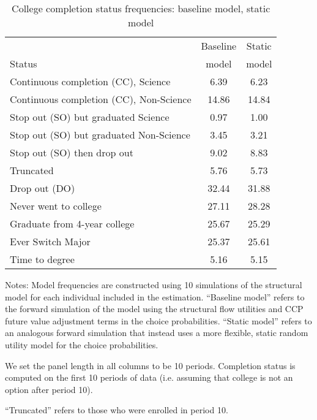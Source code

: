 \begin{table}[ht]
\caption{College completion status frequencies: baseline model, static model}
\label{tab:CCDOSOfwd-compare-fit}
\centering{}
\begin{threeparttable}
\begin{tabular}{lcc}
\toprule
                                          & Baseline & Static \\
Status                                    & model    & model  \\
\midrule
Continuous completion (CC), Science&6.39&6.23 \\
Continuous completion (CC), Non-Science&14.86&14.84 \\
Stop out (SO) but graduated Science&0.97&1.00 \\
Stop out (SO) but graduated Non-Science&3.45&3.21 \\
Stop out (SO) then drop out&9.02&8.83 \\
Truncated&5.76&5.73 \\
Drop out (DO)&32.44&31.88 \\
Never went to college&27.11&28.28 \\
\midrule
Graduate from 4-year college & 25.67 & 25.29 \\ 
Ever Switch Major & 25.37 & 25.61 \\ 
Time to degree & 5.16 & 5.15 \\ 
\bottomrule
\end{tabular}
\footnotesize Notes: Model frequencies are constructed using 10 simulations of the structural model for each individual included in the estimation. ``Baseline model'' refers to the forward simulation of the model using the structural flow utilities and CCP future value adjustment terms in the choice probabilities. ``Static model'' refers to an analogous forward simulation that instead uses a more flexible, static random utility model for the choice probabilities. 

\medskip

We set the panel length in all columns to be 10 periods. Completion status is computed on the first 10 periods of data (i.e. assuming that college is not an option after period 10).

\medskip

``Truncated'' refers to those who were enrolled in period 10.
\end{threeparttable}
\end{table}
